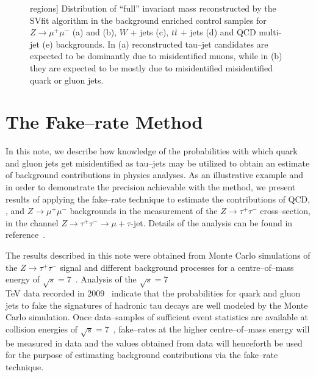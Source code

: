 \begin{figure}
\begin{center}
regions]{\captiontext 
	 Distribution of ``full'' invariant mass reconstructed by the SVfit algorithm
         in the background enriched control samples for 
         $Z \to \mu^{+} \mu^{-}$ (a) and (b), $W$ + jets (c), $t\bar{t}$ + jets (d) and QCD multi-jet (e) backgrounds.
         In (a) reconstructed tau--jet candidates are expected to be dominantly due to misidentified muons,
         while in (b) they are expected to be mostly due to misidentified misidentified quark or gluon jets.}
\label{fig:SVfitMassMuTauBgControlRegions}
\end{center}
\end{figure} 



\section{The Fake--rate Method}
\label{sec:fakerate}

In this note, we describe how knowledge of the probabilities with which quark
and gluon jets get misidentified as tau--jets may be utilized to obtain an
estimate of background contributions in physics analyses.  As an illustrative
example and in order to demonstrate the precision achievable with the method, we
present results of applying the fake--rate technique to estimate the
contributions of QCD, \WpJets, \ttbarpJets and $Z \rightarrow \mu^{+}
\mu^{-}$ backgrounds in the measurement of the $Z \rightarrow \tau^{+} \tau^{-}$
cross--section, in the channel $Z \rightarrow \tau^{+} \tau^{-} \rightarrow \mu
+ \tau\mbox{-jet}$.  Details of the analysis can be found in
reference~\cite{CMS-PAS-EWK-10-002}.

The results described in this note were obtained from Monte Carlo simulations of
the $Z \rightarrow \tau^{+} \tau^{-}$ signal and different background processes
for a centre--of--mass energy of $\sqrt{s} = 7$~\TeV.  Analysis of the $\sqrt{s}
= 7$~\\TeV data recorded in 2009~\cite{CMS-PAS-PFT-09-001} indicate that
the probabilities for quark and gluon jets to fake the signatures of hadronic
tau decays are well modeled by the Monte Carlo simulation.  Once data--samples
of sufficient event statistics are available at collision energies of $\sqrt{s}
= 7$~\TeV, fake--rates at the higher centre--of--mass energy will be measured in
data and the values obtained from data will henceforth be used for the purpose
of estimating background contributions via the fake--rate technique.

